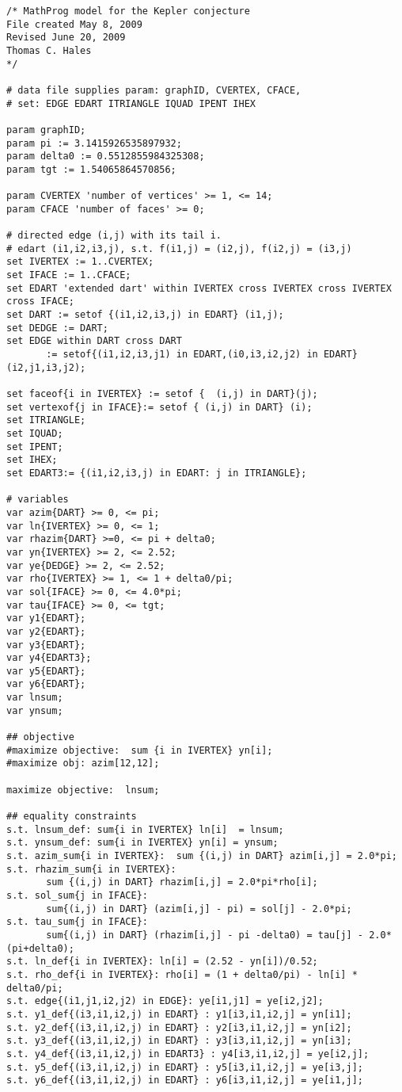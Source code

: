 \newpage
\begin{verbatim}
/* MathProg model for the Kepler conjecture
File created May 8, 2009
Revised June 20, 2009
Thomas C. Hales
*/

# data file supplies param: graphID, CVERTEX, CFACE, 
# set: EDGE EDART ITRIANGLE IQUAD IPENT IHEX

param graphID;
param pi := 3.1415926535897932;
param delta0 := 0.5512855984325308;
param tgt := 1.54065864570856;

param CVERTEX 'number of vertices' >= 1, <= 14; 
param CFACE 'number of faces' >= 0; 

# directed edge (i,j) with its tail i.
# edart (i1,i2,i3,j), s.t. f(i1,j) = (i2,j), f(i2,j) = (i3,j)
set IVERTEX := 1..CVERTEX;
set IFACE := 1..CFACE;
set EDART 'extended dart' within IVERTEX cross IVERTEX cross IVERTEX cross IFACE;
set DART := setof {(i1,i2,i3,j) in EDART} (i1,j);
set DEDGE := DART;
set EDGE within DART cross DART 
       := setof{(i1,i2,i3,j1) in EDART,(i0,i3,i2,j2) in EDART}(i2,j1,i3,j2);

set faceof{i in IVERTEX} := setof {  (i,j) in DART}(j);
set vertexof{j in IFACE}:= setof { (i,j) in DART} (i);
set ITRIANGLE;
set IQUAD;
set IPENT;
set IHEX;
set EDART3:= {(i1,i2,i3,j) in EDART: j in ITRIANGLE};

# variables
var azim{DART} >= 0, <= pi;
var ln{IVERTEX} >= 0, <= 1;
var rhazim{DART} >=0, <= pi + delta0;
var yn{IVERTEX} >= 2, <= 2.52;
var ye{DEDGE} >= 2, <= 2.52;
var rho{IVERTEX} >= 1, <= 1 + delta0/pi;
var sol{IFACE} >= 0, <= 4.0*pi;
var tau{IFACE} >= 0, <= tgt;
var y1{EDART};
var y2{EDART};
var y3{EDART};
var y4{EDART3};
var y5{EDART};
var y6{EDART};
var lnsum;
var ynsum;

## objective
#maximize objective:  sum {i in IVERTEX} yn[i];
#maximize obj: azim[12,12];

maximize objective:  lnsum;

## equality constraints
s.t. lnsum_def: sum{i in IVERTEX} ln[i]  = lnsum;
s.t. ynsum_def: sum{i in IVERTEX} yn[i] = ynsum;
s.t. azim_sum{i in IVERTEX}:  sum {(i,j) in DART} azim[i,j] = 2.0*pi;
s.t. rhazim_sum{i in IVERTEX}:  
       sum {(i,j) in DART} rhazim[i,j] = 2.0*pi*rho[i];
s.t. sol_sum{j in IFACE}: 
       sum{(i,j) in DART} (azim[i,j] - pi) = sol[j] - 2.0*pi;
s.t. tau_sum{j in IFACE}: 
       sum{(i,j) in DART} (rhazim[i,j] - pi -delta0) = tau[j] - 2.0*(pi+delta0);
s.t. ln_def{i in IVERTEX}: ln[i] = (2.52 - yn[i])/0.52;
s.t. rho_def{i in IVERTEX}: rho[i] = (1 + delta0/pi) - ln[i] * delta0/pi;
s.t. edge{(i1,j1,i2,j2) in EDGE}: ye[i1,j1] = ye[i2,j2];
s.t. y1_def{(i3,i1,i2,j) in EDART} : y1[i3,i1,i2,j] = yn[i1];
s.t. y2_def{(i3,i1,i2,j) in EDART} : y2[i3,i1,i2,j] = yn[i2];
s.t. y3_def{(i3,i1,i2,j) in EDART} : y3[i3,i1,i2,j] = yn[i3];
s.t. y4_def{(i3,i1,i2,j) in EDART3} : y4[i3,i1,i2,j] = ye[i2,j];
s.t. y5_def{(i3,i1,i2,j) in EDART} : y5[i3,i1,i2,j] = ye[i3,j];
s.t. y6_def{(i3,i1,i2,j) in EDART} : y6[i3,i1,i2,j] = ye[i1,j];


\end{verbatim}
